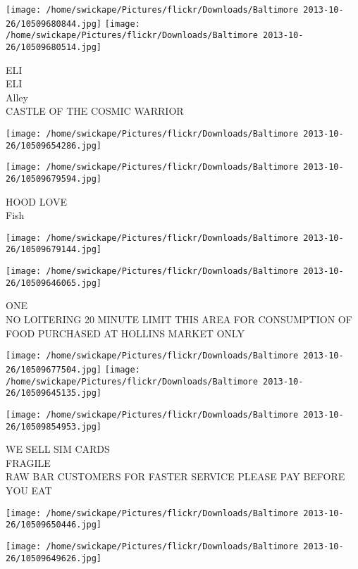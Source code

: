\documentclass[10pt,letterpaper]{article}
\begin{document}
\texttt{[image: /home/swickape/Pictures/flickr/Downloads/Baltimore 2013-10-26/10509680844.jpg]}
\texttt{[image: /home/swickape/Pictures/flickr/Downloads/Baltimore 2013-10-26/10509680514.jpg]}

ELI\\
ELI\\
Alley\\
CASTLE OF THE COSMIC WARRIOR\\
\pagebreak

\texttt{[image: /home/swickape/Pictures/flickr/Downloads/Baltimore 2013-10-26/10509654286.jpg]}

\vspace{0.25in}
\texttt{[image: /home/swickape/Pictures/flickr/Downloads/Baltimore 2013-10-26/10509679594.jpg]}

HOOD LOVE\\
Fish\\
\pagebreak

\texttt{[image: /home/swickape/Pictures/flickr/Downloads/Baltimore 2013-10-26/10509679144.jpg]}

\vspace{0.25in}
\texttt{[image: /home/swickape/Pictures/flickr/Downloads/Baltimore 2013-10-26/10509646065.jpg]}

ONE\\
NO LOITERING 20 MINUTE LIMIT THIS AREA FOR CONSUMPTION OF FOOD PURCHASED AT HOLLINS MARKET ONLY\\
\pagebreak

\texttt{[image: /home/swickape/Pictures/flickr/Downloads/Baltimore 2013-10-26/10509677504.jpg]}
\texttt{[image: /home/swickape/Pictures/flickr/Downloads/Baltimore 2013-10-26/10509645135.jpg]}

\vspace{0.25in}
\texttt{[image: /home/swickape/Pictures/flickr/Downloads/Baltimore 2013-10-26/10509854953.jpg]}

WE SELL SIM CARDS\\
FRAGILE\\
RAW BAR CUSTOMERS FOR FASTER SERVICE PLEASE PAY BEFORE YOU EAT\\
\pagebreak

\texttt{[image: /home/swickape/Pictures/flickr/Downloads/Baltimore 2013-10-26/10509650446.jpg]}

\vspace{0.25in}
\texttt{[image: /home/swickape/Pictures/flickr/Downloads/Baltimore 2013-10-26/10509649626.jpg]}
\end{document}

